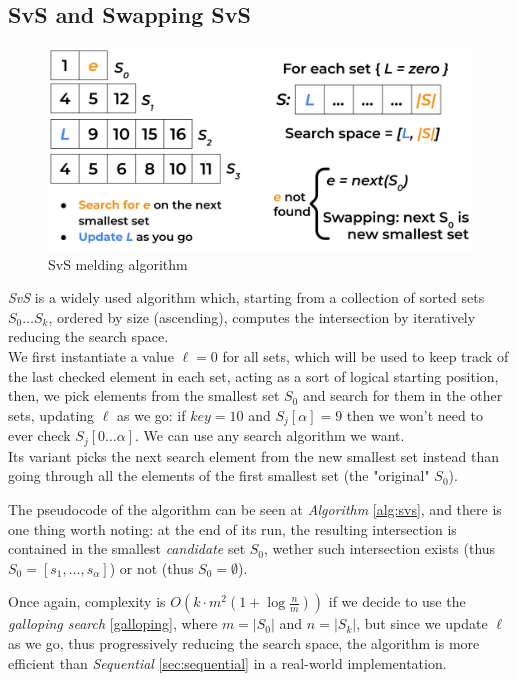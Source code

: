 \subsection{SvS and Swapping SvS \label{sec:svs}}

\begin{figure}[H] 
    \begin{center}
        \includegraphics[width=.8\textwidth]{imgs/svs.png}
        \caption{SvS melding algorithm \label{fig:svs}}
    \end{center}
\end{figure}

\textit{SvS} is a widely used algorithm which, starting from a collection of sorted sets $S_0 \ldots S_k$, ordered by size (ascending), computes the intersection by iteratively reducing the search space.\\
We first instantiate a value $\ell=0$ for all sets, which will be used to keep track of the last checked element in each set, acting as a sort of logical starting position, then, we pick elements from the smallest set $S_0$ and search for them in the other sets, updating $\ell$ as we go: if $key=10$ and $S_j[\alpha]=9$ then we won't need to ever check $S_j[0 \ldots \alpha]$. We can use any search algorithm we want. \\
Its variant picks the next search element from the new smallest set instead than going through all the elements of the first smallest set (the "original" $S_0$).

The pseudocode of the algorithm can be seen at \textit{Algorithm} \ref{alg:svs}, and there is one thing worth noting: at the end of its run, the resulting intersection is contained in the smallest \textit{candidate} set $S_0$, wether such intersection exists (thus $S_0=[s_1, \ldots, s_\alpha]$) or not (thus $S_0= \emptyset$).

Once again, complexity is $O\left(k \cdot m^2 \left(1+ \log \frac{n}{m}\right)\right)$ if we decide to use the \textit{galloping search} \ref{galloping}, where $m=|S_0|$ and $n=|S_k|$, but since we update $\ell$ as we go, thus progressively reducing the search space, the algorithm is more efficient than \textit{Sequential} \ref{sec:sequential} in a real-world implementation.

